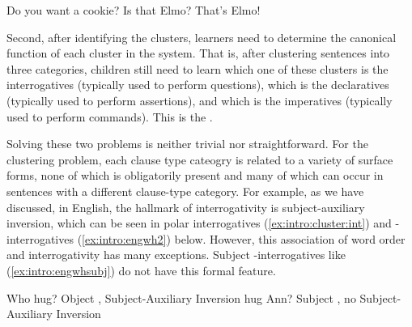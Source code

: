 Do you want a cookie?
\eex
{}
\bxl\label{ex:intro:cluster:int}
Is that Elmo?
\ex\label{ex:intro:cluster:dec}
That’s Elmo!
\exl
\eex

Second, after identifying the clusters, learners need to determine the canonical function of each cluster in the system. That is, after clustering sentences into three categories, children still need to learn which one of these clusters is the interrogatives (typically used to perform questions), which is the declaratives (typically used to perform assertions), and which is the imperatives (typically used to perform commands). This is the . %


Solving these two problems is neither trivial nor straightforward. For the clustering problem, each clause type cateogry is related to a variety of surface forms, none of which is obligatorily present and many of which can occur in sentences with a different clause-type category. For example, as we have discussed, in English, the hallmark of interrogativity is subject-auxiliary inversion, which can be seen in polar interrogatives (\ref{ex:intro:cluster:int}) and \twh-interrogatives (\ref{ex:intro:engwh2}) below. However, this association of word order and interrogativity has many exceptions. Subject \twh-interrogatives like (\ref{ex:intro:engwhsubj}) do not have this formal feature.


Who   hug? \hfill Object \twh{}, Subject-Auxiliary Inversion
\eex
{}
  hug Ann? \hfill Subject \twh{}, no Subject-Auxiliary Inversion
\eex

